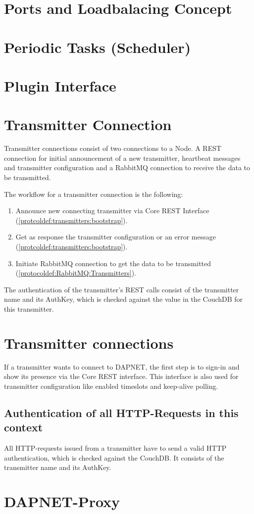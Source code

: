\section{Ports and Loadbalacing Concept}

\section{Periodic Tasks (Scheduler)}

\section{Plugin Interface}

\section{Transmitter Connection}
Transmitter connections consist of two connections to a Node. A REST connection
for initial announcement of a new transmitter, heartbeat messages and
transmitter configuration and a RabbitMQ connection to receive the data to be
transmitted.

The workflow for a transmitter connection is the following:
\begin{enumerate}
\item Announce new connecting transmitter via Core REST Interface (\ref{protcoldef:transmitters:bootstrap}).
\item Get as response the transmitter configuration or an error message (\ref{protcoldef:transmitters:bootstrap}).
\item Initiate RabbitMQ connection to get the data to be transmitted (\ref{protocoldef:RabbitMQ:Transmitters}).
\end{enumerate}

The authentication of the transmitter's REST calls consist of the transmitter
name and its AuthKey, which is checked against the value in the CouchDB for this
transmitter.

\section{Transmitter connections}
If a transmitter wants to connect to DAPNET, the first step is to sign-in and
show its presence via the Core REST interface. This interface is also used for
transmitter configuration like enabled timeslots and keep-alive polling.

\subsection{Authentication of all HTTP-Requests in this context}
All HTTP-requests issued from a transmitter have to send a valid HTTP
authentication, which is checked against the CouchDB. It consists of the
transmitter name and its AuthKey.


\section{DAPNET-Proxy}